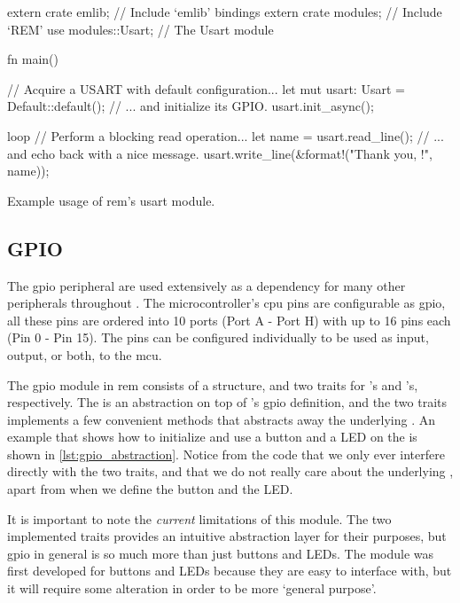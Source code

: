 \begin{listing}[H]
  \begin{rustcode}
extern crate emlib;   // Include `emlib' bindings
extern crate modules; // Include `REM'
use modules::Usart;   // The Usart module

fn main() {
  // Acquire a USART with default configuration...
  let mut usart: Usart = Default::default();
  // ... and initialize its GPIO.
  usart.init_async();

  loop {
    // Perform a blocking read operation...
    let name = usart.read_line();
    // ... and echo back with a nice message.
    usart.write_line(&format!("Thank you, {}!", name));
  }
}
  \end{rustcode}
  \caption{Example usage of \gls{rem}'s \gls{usart} module.}
  \label{lst:usart_abstraction}
\end{listing}

\subsection{GPIO} %
\label{ssub:gpio}

The \gls{gpio} peripheral are used extensively as a dependency for many other peripherals throughout {\emlib}.
The microcontroller's \gls{cpu} pins are configurable as \gls{gpio}, all these pins are ordered into 10 ports (Port A - Port H) with up to 16 pins each (Pin 0 - Pin 15).
The pins can be configured individually to be used as input, output, or both, to the \gls{mcu}.

The \gls{gpio} module in \gls{rem} consists of a  structure, and two traits for 's and 's, respectively.
The  is an abstraction on top of {\emlib}'s \gls{gpio} definition, and the two traits implements a few convenient methods that abstracts away the underlying .
An example that shows how to initialize and use a button and a LED on the {\STK} is shown in \autoref{lst:gpio_abstraction}.
Notice from the code that we only ever interfere directly with the two traits, and that we do not really care about the underlying , apart from when we define the button and the LED.

It is important to note the \emph{current} limitations of this module.
The two implemented traits provides an intuitive abstraction layer for their purposes, but \gls{gpio} in general is so much more than just buttons and LEDs.
The module was first developed for buttons and LEDs because they are easy to interface with, but it will require some alteration in order to be more `general purpose'.

